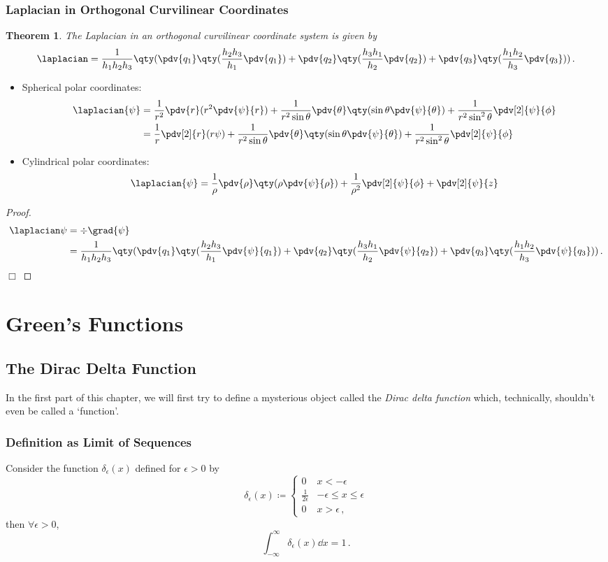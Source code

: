 \documentclass{article}
\theoremstyle{plain}\theoremheaderfont{\normalfont\itshape}\theorembodyfont{\rmfamily}\theoremseparator{.}\newtheorem*{rem}{Remark}\newtheorem*{ex}{Example}\newtheorem*{proof}{Proof}\newtheorem*{altp}{Alternative proof}
\theoremstyle{plain}\theoremheaderfont{\normalfont\bfseries}\theorembodyfont{\rmfamily}\theoremseparator{.}\newtheorem{thm}{Theorem}[section]\newtheorem{lem}[thm]{Lemma}\newtheorem{prop}[thm]{Proposition}\newtheorem*{cor}{Corollary}\newtheorem{defn}[thm]{Definition}\newtheorem{clm}[thm]{Claim}\newtheorem{clminproof}{Claim}
\theoremstyle{break}\theoremheaderfont{\normalfont\itshape}\theorembodyfont{\rmfamily}\theoremseparator{.\medskip}\newtheorem*{proofskip}{Proof}\newtheorem*{exs}{Examples}\newtheorem*{rems}{Remarks}
\theoremstyle{break}\theoremheaderfont{\normalfont\bfseries}\theorembodyfont{\rmfamily}\theoremseparator{.\medskip}\newtheorem{lemskip}[thm]{Lemma}\newtheorem{defnskip}[thm]{Definition}\newtheorem{propskip}[thm]{Proposition}\newtheorem{thmskip}[thm]{Theorem}
\numberwithin{equation}{section}
\newcommand{\qed}{\hfill\ensuremath{\Box}}
\begin{document}
	\subsubsection{Laplacian in Orthogonal Curvilinear Coordinates}
	\begin{thm}
		The Laplacian in an orthogonal curvilinear coordinate system is given by
		\[\laplacian=\frac{1}{h_1h_2h_3}\qty(\pdv{q_1}\qty(\frac{h_2h_3}{h_1}\pdv{q_1})+\pdv{q_2}\qty(\frac{h_3h_1}{h_2}\pdv{q_2})+\pdv{q_3}\qty(\frac{h_1h_2}{h_3}\pdv{q_3}))\,.\]
	\end{thm}
	\begin{itemize}[leftmargin=50pt]
		\item Spherical polar coordinates:
		\begin{align*}
			\laplacian{\psi}&=\frac{1}{r^2}\pdv{r}(r^2\pdv{\psi}{r})+\frac{1}{r^2\sin\theta}\pdv{\theta}\qty(\sin\theta\pdv{\psi}{\theta})+\frac{1}{r^2\sin^2\theta}\pdv[2]{\psi}{\phi}\\
			&=\frac{1}{r}\pdv[2]{r}(r\psi)+\frac{1}{r^2\sin\theta}\pdv{\theta}\qty(\sin\theta\pdv{\psi}{\theta})+\frac{1}{r^2\sin^2\theta}\pdv[2]{\psi}{\phi}
		\end{align*}
		\item Cylindrical polar coordinates:
		\[\laplacian{\psi}=\frac{1}{\rho}\pdv{\rho} \qty(\rho\pdv{\psi}{\rho})+\frac{1}{\rho^2}\pdv[2]{\psi}{\phi}+\pdv[2]{\psi}{z}\]
	\end{itemize}
	\begin{proof}
		\begin{align*}
			\laplacian\psi&=\div\grad{\psi}\\
			&=\frac{1}{h_1h_2h_3}\qty(\pdv{q_1}\qty(\frac{h_2h_3}{h_1}\pdv{\psi}{q_1})+\pdv{q_2}\qty(\frac{h_3h_1}{h_2}\pdv{\psi}{q_2})+\pdv{q_3}\qty(\frac{h_1h_2}{h_3}\pdv{\psi}{q_3}))\,.
		\end{align*}\qed
	\end{proof}
	\newpage

	\section{Green's Functions}
	\subsection{The Dirac Delta Function}
	In the first part of this chapter, we will first try to define a mysterious object called the \textit{Dirac delta function} which, technically, shouldn't even be called a `function'.
	\subsubsection{Definition as Limit of Sequences}
	Consider the function \(\delta_\epsilon(x)\) defined for \(\epsilon>0\) by
	\[\delta_\epsilon(x)\coloneqq\begin{cases}
		0 & x<-\epsilon\\
		\frac{1}{2\epsilon} & -\epsilon\le x\le \epsilon\\
		0 & x>\epsilon\,,
	\end{cases}\]
	then \(\forall\epsilon>0\),
	\[\int_{-\infty}^{\infty}\delta_\epsilon(x)\dd{x}=1\,.\]
	
\end{document}
